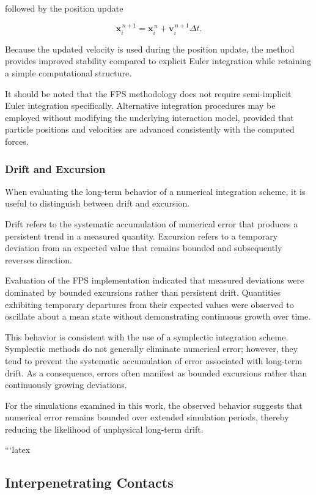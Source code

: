 followed by the position update

\begin{equation}
\mathbf{x}_i^{\,n+1}
=
\mathbf{x}_i^{\,n}
+
\mathbf{v}_i^{\,n+1}\Delta t.
\end{equation}

Because the updated velocity is used during the position
update, the method provides improved stability compared
to explicit Euler integration while retaining a simple
computational structure.

It should be noted that the FPS methodology does not
require semi-implicit Euler integration specifically.
Alternative integration procedures may be employed
without modifying the underlying interaction model,
provided that particle positions and velocities are
advanced consistently with the computed forces.

\subsubsection{Drift and Excursion}

When evaluating the long-term behavior of a numerical
integration scheme, it is useful to distinguish between
drift and excursion.

Drift refers to the systematic accumulation of numerical
error that produces a persistent trend in a measured
quantity. Excursion refers to a temporary deviation from
an expected value that remains bounded and subsequently
reverses direction.

Evaluation of the FPS implementation indicated that
measured deviations were dominated by bounded excursions
rather than persistent drift. Quantities exhibiting
temporary departures from their expected values were
observed to oscillate about a mean state without
demonstrating continuous growth over time.

This behavior is consistent with the use of a symplectic
integration scheme. Symplectic methods do not generally
eliminate numerical error; however, they tend to prevent
the systematic accumulation of error associated with
long-term drift. As a consequence, errors often manifest
as bounded excursions rather than continuously growing
deviations.

For the simulations examined in this work, the observed
behavior suggests that numerical error remains bounded
over extended simulation periods, thereby reducing the
likelihood of unphysical long-term drift.


```latex
\subsection{Interpenetrating Contacts}

